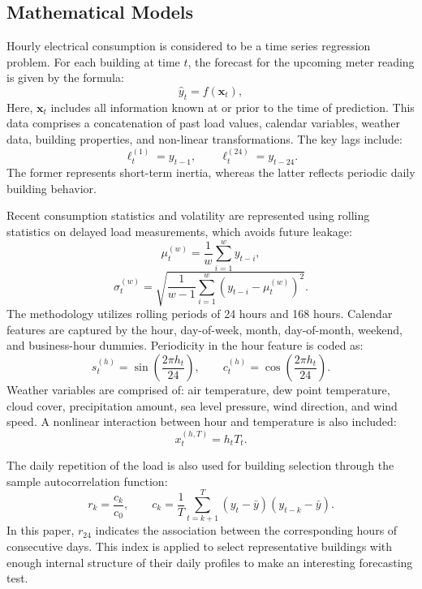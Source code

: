 \documentclass[conference]{IEEEtran}
\begin{document}
\subsection{Mathematical Models}

Hourly electrical consumption is considered to be a time series regression problem.
For each building at time $t$, the forecast for the upcoming meter reading is given by the formula:
\begin{equation}
    \hat{y}_t = f(\mathbf{x}_t),
    \label{eq:forecasting-formulation-paper}
\end{equation}
Here, $\mathbf{x}_t$ includes all information known at or prior to the time of prediction. This data comprises a concatenation of past load values, calendar variables, weather data, building properties, and non-linear transformations. The key lags include:
\begin{equation}
    \ell_t^{(1)} = y_{t-1}, \qquad \ell_t^{(24)} = y_{t-24}.
\end{equation}
The former represents short-term inertia, whereas the latter reflects periodic daily building behavior.

Recent consumption statistics and volatility are represented using rolling
statistics on delayed load measurements, which avoids future leakage:
\begin{equation}
    \mu_t^{(w)} = \frac{1}{w}\sum_{i=1}^{w} y_{t-i},
\end{equation}
\begin{equation}
    \sigma_t^{(w)} =
    \sqrt{\frac{1}{w-1}\sum_{i=1}^{w}\left(y_{t-i}-\mu_t^{(w)}\right)^2}.
\end{equation}
The methodology utilizes rolling periods of 24 hours and 168 hours. Calendar
features are captured by the hour, day-of-week, month, day-of-month,
weekend, and business-hour dummies. Periodicity in the hour feature is coded as:
\begin{equation}
    s_t^{(h)} = \sin\left(\frac{2\pi h_t}{24}\right), \qquad
    c_t^{(h)} = \cos\left(\frac{2\pi h_t}{24}\right).
\end{equation}
Weather variables are comprised of: air temperature, dew point temperature,
cloud cover, precipitation amount, sea level pressure, wind direction, and
wind speed. A nonlinear interaction between hour and temperature is also
included:
\begin{equation}
    x_t^{(h,T)} = h_t T_t.
\end{equation}

The daily repetition of the load is also used for building selection through the
sample autocorrelation function:
\begin{equation}
    r_k = \frac{c_k}{c_0}, \qquad
    c_k = \frac{1}{T}\sum_{t=k+1}^{T}(y_t-\bar{y})(y_{t-k}-\bar{y}).
\end{equation}
In this paper, $r_{24}$ indicates the association between the corresponding hours of
consecutive days. This index is applied to select representative buildings with
enough internal structure of their daily profiles to make an interesting forecasting test.
\end{document}
